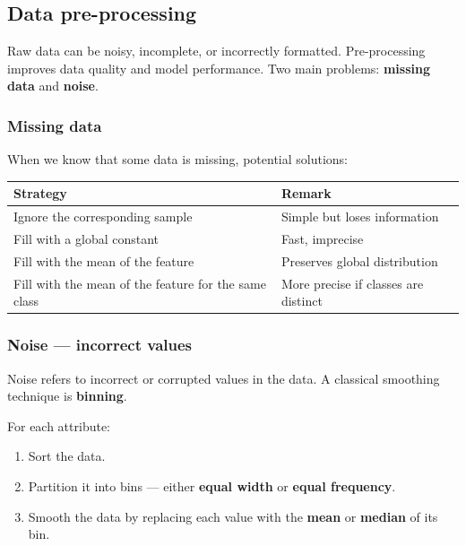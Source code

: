 \documentclass[11pt,a4paper,openany]{book}
\begin{document}
\subsection{Data pre-processing}

Raw data can be noisy, incomplete, or incorrectly formatted. Pre-processing improves data quality and model performance. Two main problems: \textbf{missing data} and \textbf{noise}.

\subsubsection{Missing data}

When we know that some data is missing, potential solutions:

\begin{defnbox}[title=Missing data — potential solutions]
\renewcommand{\arraystretch}{1.3}
\begin{tabular}{l l}
\textbf{Strategy} & \textbf{Remark} \\
\hline
Ignore the corresponding sample & Simple but loses information \\
Fill with a global constant & Fast, imprecise \\
Fill with the mean of the feature & Preserves global distribution \\
Fill with the mean of the feature for the same class & More precise if classes are distinct \\
\end{tabular}
\end{defnbox}

\subsubsection{Noise — incorrect values}

Noise refers to incorrect or corrupted values in the data. A classical smoothing technique is \textbf{binning}.

\begin{algbox}[title=Binning]
For each attribute:
\begin{enumerate}
    \item Sort the data.
    \item Partition it into bins — either \textbf{equal width} or \textbf{equal frequency}.
    \item Smooth the data by replacing each value with the \textbf{mean} or \textbf{median} of its bin.
\end{enumerate}
\end{algbox}
\end{document}

